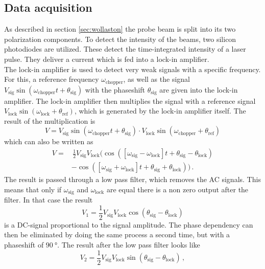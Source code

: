 \subsection{Data acquisition}
\label{sec:data_acq}
As described in section \ref{sec:wollaston} the probe beam is split into its two polarization components.
To detect the intensity of the beams, two silicon photodiodes are utilized.
These detect the time-integrated intensity of a laser pulse.
They deliver a current which is fed into a lock-in amplifier.
\\
The lock-in amplifier is used to detect very weak signals with a specific frequency.
For this, a reference frequency $\omega_\text{chopper}$, as well as the signal $V_\text{sig}\sin(\omega_\text{chopper}t + \theta_\text{sig})$ with the phaseshift $\theta_\text{sig}$ are given into the lock-in amplifier.
The lock-in amplifier then multiplies the signal with a reference signal $V_\text{lock}\sin(\omega_\text{lock} + \theta_\text{ref})$, which is generated by the lock-in amplifier itself.
The result of the multiplication is
\begin{equation}
    V = V_\text{sig}\sin(\omega_\text{chopper}t + \theta_\text{sig})\cdot V_\text{lock}\sin(\omega_\text{chopper} + \theta_\text{ref})
\end{equation}
which can also be written as 
\begin{equation}
\begin{aligned}
    V = & \,\frac{1}{2} V_\text{sig} V_\text{lock} ( \cos([\omega_\text{sig} - \omega_\text{lock}]t +\theta_\text{sig} - \theta_\text{lock})\\ 
    & - \cos([\omega_\text{sig} + \omega_\text{lock}]t +\theta_\text{sig} + \theta_\text{lock})) \, .
\end{aligned}
\end{equation}
The result is passed through a low pass filter, which removes the AC signals.
This means that only if $\omega_\text{sig}$ and $\omega_\text{lock}$ are equal there is a non zero output after the filter.
In that case the result 
\begin{equation}
    V_1 = \frac{1}{2}V_\text{sig}V_\text{lock}\cos(\theta_\text{sig}-\theta_\text{lock})
\end{equation} 
is a DC-signal proportional to the signal amplitude.
The phase dependency can then be eliminated by doing the same process a second time, but with a phaseshift of $\SI{90}{\degree}$.
The result after the low pass filter looks like
\begin{equation}
    V_2 = \frac{1}{2}V_\text{sig}V_\text{lock}\sin(\theta_\text{sig}-\theta_\text{lock})\, ,
\end{equation}
